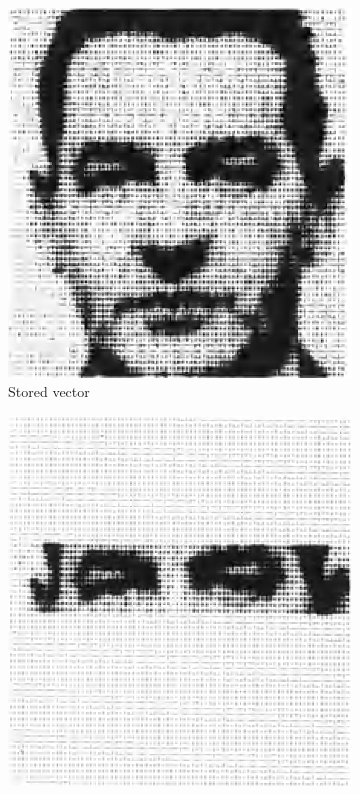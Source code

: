 \documentclass[runningheads]{llncs}
\begin{document}
\begin{figure}
     \centering
     \begin{subfigure}[b]{0.3\textwidth}
         \centering
         \includegraphics[width=\textwidth]{img/kohonenA.png}
         \caption{Stored vector}
         \label{kohonenA}
     \end{subfigure}
     \hfill
     \begin{subfigure}[b]{0.3\textwidth}
         \centering
         \includegraphics[width=\textwidth]{img/kohonenB.png}

\end{subfigure}
\end{figure}
\end{document}

